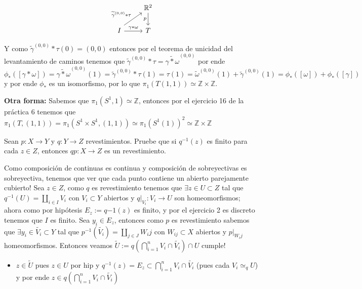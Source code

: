 \documentclass[11pt]{article}
\newcommand{\R}{{\mathbb{R}}}
\newenvironment{proof}[1][Demostraci\'on]{\begin{trivlist}
\item[\hskip \labelsep {\bfseries #1}]}{\end{trivlist}}
\newcommand{\qed}{\nobreak \ifvmode \relax \else
      \ifdim\lastskip<1.5em \hskip-\lastskip
      \hskip1.5em plus0em minus0.5em \fi \nobreak
      \vrule height0.75em width0.5em depth0.25em\fi}
\newcommand{\Z}{\mathbb{Z}}
\begin{document}
\begin{enumerate}
\begin{proof}
\[
\begin{tikzcd}
& \R^2 \arrow[swap]{d}{p} \\ \quad 
I \arrow{r}{\gamma*\omega} \arrow{ur}{\widetilde{\gamma}^{(0,0)}*\tau} & T
\end{tikzcd}
\]

Y como $\widetilde{\gamma}^{(0,0)}*\tau(0)=(0,0)$ entonces por el teorema de unicidad del levantamiento de caminos tenemos que $\widetilde{\gamma}^{(0,0)}*\tau = \widetilde{\gamma*\omega}^{(0,0)}$ por ende $\phi_*([\gamma*\omega]) = \widetilde{\gamma*\omega}^{(0,0)}(1)=\widetilde{\gamma}^{(0,0)}*\tau(1) = \tau(1) = \widetilde{\omega}^{(0,0)}(1) + \widetilde{\gamma}^{(0,0)}(1) = \phi_*([\omega]) + \phi_*([\gamma])$ y por ende $\phi_*$ es un isomorfismo, por lo que $\pi_1(T(1,1)) \simeq \Z \times \Z$.

\textbf{Otra forma:} Sabemos que $\pi_1(S^1,1) \simeq \Z$, entonces por el ejercicio 16 de la pr\'actica 6 tenemos que $\pi_1(T,(1,1)) = \pi_1(S^1 \times S^1 , (1,1)) \simeq \pi_1(S^1(1))^2 \simeq \Z \times \Z$ \qed

\end{proof}

\item {Sean $p:X\to Y$ y $q:Y\to Z$ revestimientos.
Pruebe que si $q^{-1}(z)$ es finito para cada $z\in Z$, entonces $qp:X\to Z$ es un revestimiento.
}

\begin{proof}

Como composici\'on de continuas es continua y composici\'on de sobreyectivas es sobreyectiva, tenemos que ver que cada punto contiene un abierto parejamente cubierto! Sea $z \in Z$, como $q$ es revestimiento tenemos que $\exists z \in U \subset Z$ tal que $q^{-1}(U) = \coprod_{i \in I}{V_i}$ con $V_i \subset Y$ abiertos y $q|_{V_i}:V_i \rightarrow U$ son homeomorfismos; ahora como por hip\'otesis $E_{z}:=q{-1}(z)$ es finito, y por el ejercicio 2 es discreto tenemos que $I$ es finito. Sea $y_i \in E_z$, entonces como $p$ es revestimiento sabemos que $\exists y_i \in \widetilde{V_i} \subset Y$ tal que $p^{-1}(\widetilde{V_i}) = \coprod_{j \in J}{W_ij}$ con $W_{ij} \subset X$ abiertos y $p|_{W_ij}$ homeomorfismos. Entonces veamos $\widetilde{U} := q(\bigcap_{i=1}^{n}{V_i \cap \widetilde{V_i}}) \cap U$ cumple!

\begin{itemize}

\item $z \in \widetilde{U}$ pues $z \in U$ por hip y $q^{-1}(z) = E_z \subset \bigcap_{i=1}^{n}{V_i \cap \widetilde{V_i}}$ (pues cada $V_i \simeq_q U$) y por ende $z \in q(\bigcap_{i=1}^{n}{V_i \cap \widetilde{V_i}}) $


\end{itemize}
\end{proof}
\end{enumerate}
\end{document}
